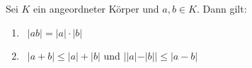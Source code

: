 Sei $K$ ein angeordneter Körper und $a, b \in K$. Dann gilt:
\begin{enumerate}[label="",leftmargin=0pt]
    \item {} \, $|ab| = |a| \cdot |b|$
    \item {} \, $|a+b| \leq |a| + |b|$ und $||a| - |b|| \leq |a-b|$
\end{enumerate}